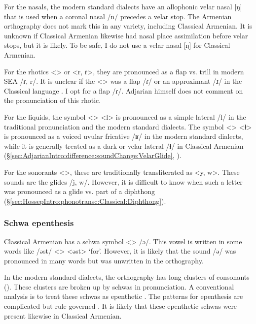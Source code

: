 \documentclass[output=paper]{langscibook}
\begin{document}
For the nasals, the modern standard dialects have an allophonic velar nasal [ŋ] that is used when a coronal nasal /n/ precedes a velar stop. The Armenian orthography does not mark this in any variety, including Classical Armenian. It is unknown if Classical Armenian likewise had nasal place assimilation before velar stops, but it is likely. To be safe, I do not use a velar nasal [ŋ] for Classical Armenian. 

For the rhotics <> or <r, ṙ>, they are pronounced as a flap vs. trill in   modern SEA /ɾ, r/. It is unclear if the <> was a flap /ɾ/ or an approximant /ɹ/ in the Classical language \citep[1040]{Macak-2017-PhonoClassicalArmenian}. I opt for a flap /ɾ/. Adjarian himself does not comment on the pronunciation of this rhotic. 


For the liquids, the symbol <> <l> is pronounced as a simple lateral /l/ in the traditional pronunciation and the modern standard dialects. The symbol <> <ɫ> is pronounced as a voiced uvular fricative /ʁ/ in the modern standard dialects, while it is generally treated as a dark or velar lateral /ɫ/ in Classical Armenian (\S\ref{sec:AdjarianIntro:difference:soundChange:VelarGlide}, \citealt[ch2]{Macak-2016-StudiesClassicalModernArmenianPhono}).

For the sonorants <>, these are traditionally transliterated as <y, w>. These sounds are the glides /j, w/. However, it is difficult to know when such a letter was pronounced as a glide vs. part of a diphthong (\S\ref{sec:HossepIntro:phonotransc:Classical:Diphthong}). 

\subsubsection{Schwa epenthesis}\label{sec:HossepIntro:phonotransc:CA:schwa}


Classical Armenian has a schwa symbol <> /ə/. This vowel is written in some words like /əst/ <> <əst> `for'. However, it is likely that the sound /ə/ was pronounced in many words but was unwritten in the orthography. 

In the modern standard dialects, the orthography has long clusters of consonants (). These clusters are broken up by schwas in pronunciation. A conventional analysis is to treat these schwas as epenthetic \citep{Vaux-1998-ArmenianPhono}. The patterns for epenthesis are complicated but rule-governed \citep[cf.][]{Dolatian-prep-Schwa}. It is likely that these epenthetic schwas were present likewise in Classical Armenian. 
\end{document}
